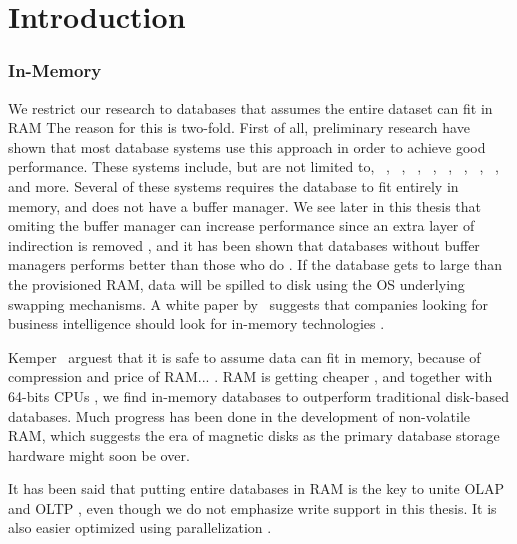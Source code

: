 \chapter{Introduction}
\label{chap:introduction}
\clearpage




\subsection{In-Memory}
\label{sub:In-Memory}
We restrict our research to databases that assumes the entire dataset can fit in RAM The reason for this is two-fold. First of all, preliminary research have shown that most database systems use this approach in order to achieve good performance. These systems include, but are not limited to, \oracle~\cite{Lahiri2015-mz}, \saph~\cite{Farber2012-vh}, \gorilla~\cite{Pelkonen2015-ko}, \qlikview~\cite{Qlik2011-ef}, \tableau~\cite{Kamkolkar2015-iq}, \monetdb~\cite{Boncz2002-yj}, \blink~\cite{Barber2012-xt}, \sapnw~\cite{Lemke2010-is}, and more. Several of these systems requires the database to fit entirely in memory, and does not have a buffer manager. We see later in this thesis that omiting the buffer manager can increase performance since an extra layer of indirection is removed \cite{Graefe2014-ds}, and it has been shown that databases without buffer managers performs better than those who do \cite{Ferrari2012-hm}. If the database gets to large than the provisioned RAM, data will be spilled to disk using the OS underlying swapping mechanisms.  A white paper by \qlikview~suggests that companies looking for business intelligence should look for in-memory technologies \cite{Bereanu2010-tj}.

Kemper \ea~arguest that it is safe to assume data can fit in memory, because of compression and price of RAM... \cite{Kemper2011-ap} . RAM is getting cheaper \cite{Exasol2014-xh}, and together with 64-bits CPUs \cite{Delaney2014-ip}, we find in-memory databases to outperform traditional disk-based databases. Much progress has been done in the development of non-volatile RAM, which suggests the era of magnetic disks as the primary database storage hardware might soon be over.

It has been said that putting entire databases in RAM is the key to unite OLAP and OLTP \cite{Faust2015-ke}, even though we do not emphasize write support in this thesis. It is also easier optimized using parallelization \cite{Psaroudakis2013-fn}.

